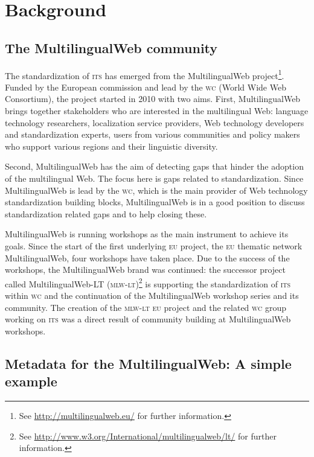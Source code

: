 \documentclass[output=paper]{LSP/langsci}
\begin{document}
\section{Background}\label{sec:sasaki:2}

\subsection{The MultilingualWeb community}\label{sec:sasaki:2.1}

The standardization of \textsc{its } has emerged from the MultilingualWeb project\footnote{See \url{http://multilingualweb.eu/} for further information.}. Funded by the European commission and lead by the \textsc{wc} (World Wide Web Consortium), the project started in 2010 with two aims. First, MultilingualWeb brings together stakeholders who are interested in the multilingual Web: language technology researchers, localization service providers, Web technology developers and standardization experts, users from various communities and policy makers who support various regions and their linguistic diversity.

Second, MultilingualWeb has the aim of detecting gaps that hinder the adoption of the multilingual Web. The focus here is gaps related to standardization. Since MultilingualWeb is lead by the \textsc{wc}, which is the main provider of Web technology standardization building blocks, MultilingualWeb is in a good position to discuss standardization related gaps and to help closing these.

MultilingualWeb is running workshops as the main instrument to achieve its goals. Since the start of the first underlying \textsc{eu} project, the \textsc{eu} thematic network MultilingualWeb, four workshops have taken place. Due to the success of the workshops, the MultilingualWeb brand was continued: the successor project called MultilingualWeb-LT (\textsc{mlw-lt})\footnote{See \url{http://www.w3.org/International/multilingualweb/lt/} for further information.} is supporting the standardization of \textsc{its } within \textsc{wc} and the continuation of the MultilingualWeb workshop series and its community. The creation of the \textsc{mlw-lt} \textsc{eu} project and the related \textsc{wc} group working on \textsc{its } was a direct result of community building at MultilingualWeb workshops.

\subsection{Metadata for the MultilingualWeb: A simple example}\label{sec:sasaki:2.2}
\end{document}
